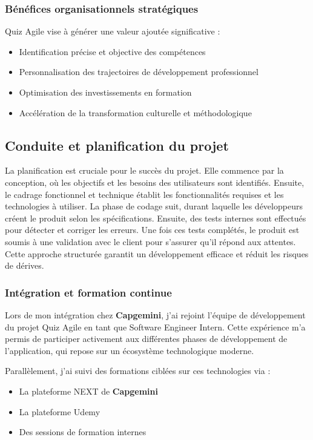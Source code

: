 \documentclass[12pt,a4paper]{report}
\begin{document}
\subsubsection{Bénéfices organisationnels stratégiques}

Quiz Agile vise à générer une valeur ajoutée significative :
\begin{itemize}
\item Identification précise et objective des compétences
\item Personnalisation des trajectoires de développement professionnel
\item Optimisation des investissements en formation
\item Accélération de la transformation culturelle et méthodologique
\end{itemize}

\subsection{Conduite et planification du projet}

La planification est cruciale pour le succès du projet. Elle commence par la conception, où les objectifs et les besoins des utilisateurs sont identifiés. Ensuite, le cadrage fonctionnel et technique établit les fonctionnalités requises et les technologies à utiliser. La phase de codage suit, durant laquelle les développeurs créent le produit selon les spécifications. Ensuite, des tests internes sont effectués pour détecter et corriger les erreurs. Une fois ces tests complétés, le produit est soumis à une validation avec le client pour s'assurer qu'il répond aux attentes. Cette approche structurée garantit un développement efficace et réduit les risques de dérives.

\subsubsection{Intégration et formation continue}

Lors de mon intégration chez \textbf{Capgemini}, j'ai rejoint l'équipe de développement du projet Quiz Agile en tant que Software Engineer Intern. Cette expérience m'a permis de participer activement aux différentes phases de développement de l'application, qui repose sur un écosystème technologique moderne.

Parallèlement, j'ai suivi des formations ciblées sur ces technologies via :
\begin{itemize}
\item La plateforme NEXT de \textbf{Capgemini}
\item La plateforme Udemy
\item Des sessions de formation internes
\end{itemize}
\end{document}
